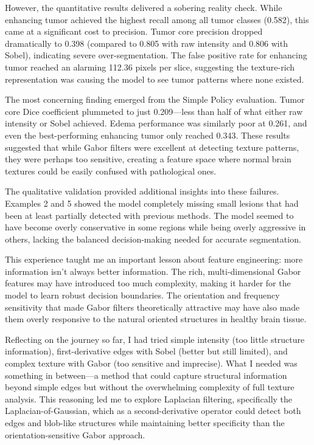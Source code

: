 However, the quantitative results delivered a sobering reality check. While enhancing tumor achieved the highest recall among all tumor classes (0.582), this came at a significant cost to precision. Tumor core precision dropped dramatically to 0.398 (compared to 0.805 with raw intensity and 0.806 with Sobel), indicating severe over-segmentation. The false positive rate for enhancing tumor reached an alarming 112.36 pixels per slice, suggesting the texture-rich representation was causing the model to see tumor patterns where none existed.

The most concerning finding emerged from the Simple Policy evaluation. Tumor core Dice coefficient plummeted to just 0.209—less than half of what either raw intensity or Sobel achieved. Edema performance was similarly poor at 0.261, and even the best-performing enhancing tumor only reached 0.343. These results suggested that while Gabor filters were excellent at detecting texture patterns, they were perhaps too sensitive, creating a feature space where normal brain textures could be easily confused with pathological ones.

The qualitative validation provided additional insights into these failures. Examples 2 and 5 showed the model completely missing small lesions that had been at least partially detected with previous methods. The model seemed to have become overly conservative in some regions while being overly aggressive in others, lacking the balanced decision-making needed for accurate segmentation.

This experience taught me an important lesson about feature engineering: more information isn't always better information. The rich, multi-dimensional Gabor features may have introduced too much complexity, making it harder for the model to learn robust decision boundaries. The orientation and frequency sensitivity that made Gabor filters theoretically attractive may have also made them overly responsive to the natural oriented structures in healthy brain tissue.

Reflecting on the journey so far, I had tried simple intensity (too little structure information), first-derivative edges with Sobel (better but still limited), and complex texture with Gabor (too sensitive and imprecise). What I needed was something in between—a method that could capture structural information beyond simple edges but without the overwhelming complexity of full texture analysis. This reasoning led me to explore Laplacian filtering, specifically the Laplacian-of-Gaussian, which as a second-derivative operator could detect both edges and blob-like structures while maintaining better specificity than the orientation-sensitive Gabor approach.

